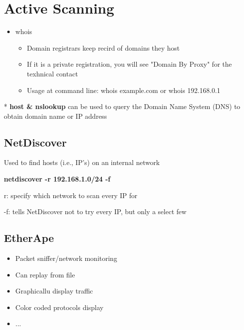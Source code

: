 \section{Active Scanning}
\begin{flushleft}
\begin{itemize}
	\item whois
		\begin{itemize}
			\item Domain registrars keep recird of domains they host
			\item If it is a private registration, you will see "Domain By Proxy" for the texhnical contact
			\item Usage at command line: whois example.com or whois 192.168.0.1
		\end{itemize}
\end{itemize}
* \textbf{host \& nslookup} can be used to query the Domain Name System (DNS) to obtain domain name or IP address

\subsection{NetDiscover}
Used to find hosts (i.e., IP's) on an internal network

\textbf{netdiscover -r 192.168.1.0/24 -f}

r: specify which network to scan every IP for

-f: tells NetDiscover not to try every IP, but only a select few

\subsection{EtherApe}
\begin{itemize}
	\item Packet sniffer/network monitoring
	\item Can replay from file
	\item Graphicallu display traffic
	\item Color coded protocols display
	\item ...
\end{itemize}

\end{flushleft}
